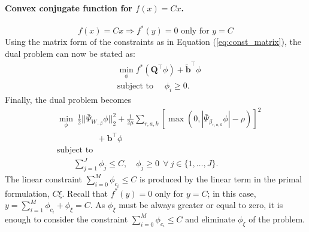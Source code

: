 \paragraph{Convex conjugate function for $f(x) = Cx$.}
\begin{equation}
f(x) = Cx \Rightarrow f^*(y) = 0 \mbox{ only for } y=C
\end{equation}
Using the matrix form of the constraints as in Equation (\ref{eq:const_matrix}), the dual problem can now be stated as:
\begin{equation}
\begin{split}
&\min_{\phi} f^*(\mathbf{Q}^\top \phi) + \tilde{\mathbf{b}}^\top \phi\\
&\mbox{subject to } \quad \phi_i \ge 0.
\end{split}
\end{equation}
Finally, the dual problem becomes
\begin{equation}
\begin{split}
& \min_{\phi} ~\frac{1}{2}||\bar\Psi_{W_{-\beta}} \phi||_2^2 + \frac{1}{2\mu}\sum_{r,a,k}[\max(0,|\bar\Psi_{\beta_{r,a,k}} \phi| - \rho)]^2 \\ & \hspace{2cm}+ \mathbf{b}^\top \phi \\
& \mbox{subject to} \\
&\quad\quad \sum_{j=1}^J \phi_{j} \leq C,\quad \phi_{j} \ge 0 ~~\forall~ j \in \{1,\dots,J\}.
\end{split}
\end{equation}
The linear constraint $\sum_{i=0}^M \phi_{c_i} \leq C$ is produced by the linear term in the primal formulation, $C\xi$. Recall that $f^*(y) = 0$ only for $y = C$; in this case, $y = \sum_{i=1}^M \phi_{c_i} + \phi_{\xi} = C$. As $\phi_{\xi}$ must be always greater or equal to zero, it is enough to consider the constraint $\sum_{i=0}^M \phi_{c_i} \leq C$ and eliminate $\phi_{\xi}$ of the problem. 

